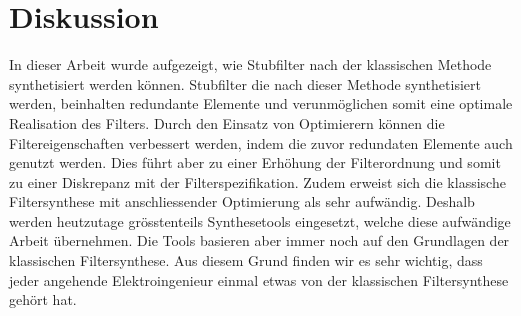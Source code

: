 \section{Diskussion}

In dieser Arbeit wurde aufgezeigt, wie Stubfilter nach der klassischen Methode synthetisiert werden können. Stubfilter die nach dieser Methode synthetisiert werden, beinhalten redundante Elemente und verunmöglichen somit eine optimale Realisation des Filters. Durch den Einsatz von Optimierern können die Filtereigenschaften verbessert werden, indem die zuvor redundaten Elemente auch genutzt werden. Dies führt aber zu einer Erhöhung der Filterordnung und somit zu einer Diskrepanz mit der Filterspezifikation. Zudem erweist sich die klassische Filtersynthese mit anschliessender Optimierung als sehr aufwändig. Deshalb werden heutzutage grösstenteils Synthesetools eingesetzt, welche diese aufwändige Arbeit übernehmen. Die Tools basieren aber immer noch auf den Grundlagen der klassischen Filtersynthese. Aus diesem Grund finden wir es sehr wichtig, dass jeder angehende Elektroingenieur einmal etwas von der klassischen Filtersynthese gehört hat.
